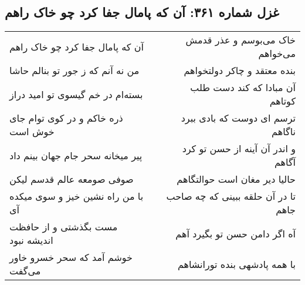\begin{center}
\section*{غزل شماره ۳۶۱: آن که پامال جفا کرد چو خاک راهم}
\label{sec:sh361}
\begin{longtable}{l p{0.5cm} r}
آن که پامال جفا کرد چو خاک راهم
&&
خاک می‌بوسم و عذر قدمش می‌خواهم
\\
من نه آنم که ز جور تو بنالم حاشا
&&
بنده معتقد و چاکر دولتخواهم
\\
بسته‌ام در خم گیسوی تو امید دراز
&&
آن مبادا که کند دست طلب کوتاهم
\\
ذره خاکم و در کوی توام جای خوش است
&&
ترسم ای دوست که بادی ببرد ناگاهم
\\
پیر میخانه سحر جام جهان بینم داد
&&
و اندر آن آینه از حسن تو کرد آگاهم
\\
صوفی صومعه عالم قدسم لیکن
&&
حالیا دیر مغان است حوالتگاهم
\\
با من راه نشین خیز و سوی میکده آی
&&
تا در آن حلقه ببینی که چه صاحب جاهم
\\
مست بگذشتی و از حافظت اندیشه نبود
&&
آه اگر دامن حسن تو بگیرد آهم
\\
خوشم آمد که سحر خسرو خاور می‌گفت
&&
با همه پادشهی بنده تورانشاهم
\\
\end{longtable}
\end{center}
